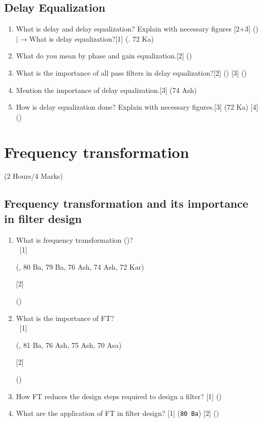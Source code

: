 \documentclass[12pt]{article}
\newcommand{\lb}{\\$\left|\rightarrow\right.$}
\newcommand{\enter}{\\\textcolor{white}{1}}
\begin{document}
		\subsection{Delay Equalization}
			\begin{enumerate}
				\item What is delay and delay equalization? Explain with necessary figures \hfill[2+3] ()
				\lb What is delay equalization?\hfill[1] (. 72 Ka)

				\item What do you mean by phase and gain equalization.\hfill[2] ()

				\item What is the importance of all pass filters in delay equalization?\hfill[2] () [3] ()

				\item Mention the importance of delay equalization.\hfill[3] (74 Ash)

				\item How is delay equalization done? Explain with necessary figures.\hfill[3] (72 Ka) [4] ()
			\end{enumerate}

	\pagebreak
\section{Frequency transformation}
	\begin{center}(2 Hours/4 Marks)\end{center}
	\subsection{Frequency transformation and its importance in filter design}
		\begin{enumerate}[noitemsep, topsep=0pt]
			\item What is frequency transformation ()?
			\enter \hfill [1] \begin{tiny} (, 80 Ba, 79 Ba, 76 Ash, 74 Ash, 72 Kar) \end{tiny} [2] \begin{footnotesize} () \end{footnotesize}			 
			
			\item What is the importance of FT?
			\enter\hfill [1] \begin{footnotesize} (, 81 Ba, 76 Ash, 75 Ash, 70 Asa) \end{footnotesize} [2] \begin{footnotesize} () \end{footnotesize}
			
			\item How FT reduces the design steps required to design a filter? \hfill [1] ()
			
			\item What are the application of FT in filter design? \hfill[1] (\texttt{80 Ba}) [2] ()
		\end{enumerate}
\end{document}
